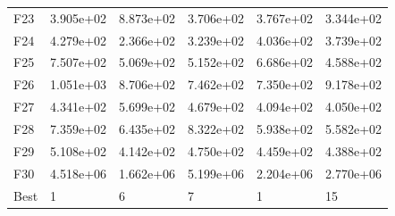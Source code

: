 \begin{tabular}{llllll}
F23  &  3.905e+02 &  8.873e+02 &  3.706e+02 &  3.767e+02 &  3.344e+02 \\
F24  &  4.279e+02 &  2.366e+02 &  3.239e+02 &  4.036e+02 &  3.739e+02 \\
F25  &  7.507e+02 &  5.069e+02 &  5.152e+02 &  6.686e+02 &  4.588e+02 \\
F26  &  1.051e+03 &  8.706e+02 &  7.462e+02 &  7.350e+02 &  9.178e+02 \\
F27  &  4.341e+02 &  5.699e+02 &  4.679e+02 &  4.094e+02 &  4.050e+02 \\
F28  &  7.359e+02 &  6.435e+02 &  8.322e+02 &  5.938e+02 &  5.582e+02 \\
F29  &  5.108e+02 &  4.142e+02 &  4.750e+02 &  4.459e+02 &  4.388e+02 \\
F30  &  4.518e+06 &  1.662e+06 &  5.199e+06 &  2.204e+06 &  2.770e+06 \\
Best &          1 &          6 &          7 &          1 &         15 \\
\bottomrule
\end{tabular}
